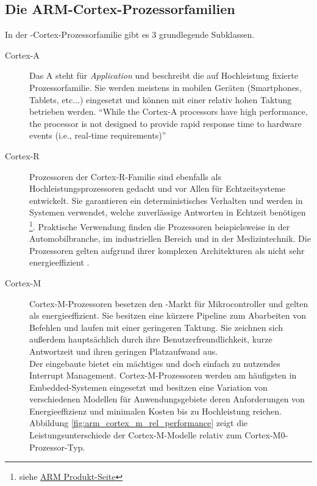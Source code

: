 	\subsection{Die ARM-Cortex-Prozessorfamilien}
	\label{sec:cortex_fam}
	In der -Cortex-Prozessorfamilie gibt es 3 grundlegende Subklassen.
	\begin{description}
	    \item[Cortex-A] Das A steht für \textit{Application} und beschreibt die auf Hochleistung fixierte Prozessorfamilie.
	    Sie werden meistens in mobilen Geräten (Smartphones, Tablets, etc...) eingesetzt und können mit einer
	    relativ hohen Taktung betrieben werden.
	    ``While the Cortex-A processors have high performance, the processor is not designed to
          provide rapid response time to hardware events (i.e., real-time requirements)''\citep[Kap.~0]{Yiu2015}
	    \item[Cortex-R] Prozessoren der Cortex-R-Familie sind ebenfalls als Hochleistungsprozessoren gedacht und
	    vor Allen für Echtzeitsysteme entwickelt. Sie garantieren ein deterministisches Verhalten und werden in
	    Systemen verwendet, welche zuverlässige Antworten in Echtzeit benötigen
	    \footnote{siehe \href{https://www.arm.com/products/processors/cortex-r}{ARM Produkt-Seite}}.
	    Praktische Verwendung finden die Prozessoren beispielsweise in der Automobilbranche, im industriellen Bereich
	    und in der Medizintechnik.
	    Die Prozessoren gelten aufgrund ihrer komplexen Architekturen als nicht sehr energieeffizient
	    \citep[vgl.~Kap.~0]{Yiu2015}.
	    \item[Cortex-M] Cortex-M-Prozessoren besetzen den -Markt für Mikrocontroller und gelten als
	    energieeffizient. Sie besitzen eine kürzere Pipeline zum Abarbeiten von Befehlen und laufen mit einer geringeren
	    Taktung. Sie zeichnen sich außerdem hauptsächlich durch ihre Benutzerfreundlichkeit, kurze Antwortzeit und ihren
	    geringen Platzaufwand aus.\\
	    Der eingebaute  bietet ein mächtiges und doch einfach zu nutzendes
	    Interrupt Management\citep[vgl. Kap. 0]{Yiu2015}.
	    Cortex-M-Prozessoren werden am häufigsten in Embedded-Systemen eingesetzt und besitzen eine Variation von
	    verschiedenen Modellen für Anwendungsgebiete deren Anforderungen von Energieeffizienz und minimalen Kosten bis
	    zu Hochleistung reichen.
	    Abbildung \ref{fig:arm_cortex_m_rel_performance} zeigt die Leistungsunterschiede der Cortex-M-Modelle relativ
	    zum Cortex-M0-Prozessor-Typ.


\end{description}
